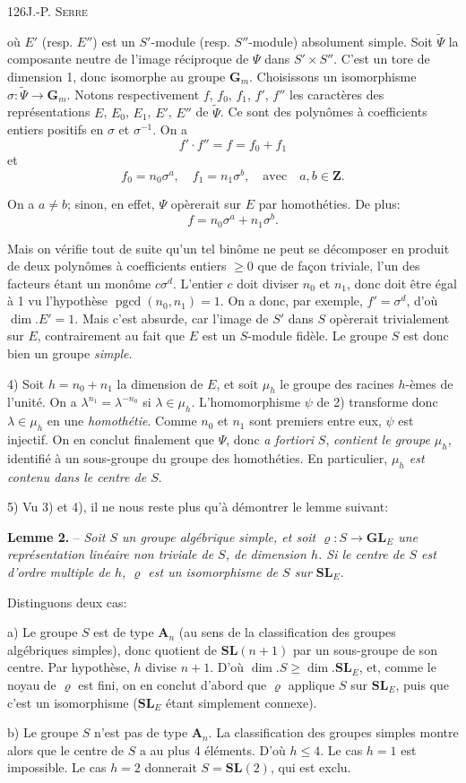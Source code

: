 126\hfill J.-P. \textsc{Serre}

 où $E'$ (resp. $E''$) est un $S'$-module (resp. $S''$-module) absolument simple. Soit $\widetilde\Psi$ la composante neutre de l'image réciproque de $\Psi$ dans $S'\times S''$. C'est un tore de dimension 1, donc isomorphe au groupe $\mathbf G_m$. Choisissons un isomorphisme $\sigma:\widetilde\Psi\to\mathbf G_m$. Notons respectivement $f$, $f_0$, $f_1$, $f'$, $f''$ les caractères des représentations $E$, $E_0$, $E_1$, $E'$, $E''$ de $\widetilde\Psi$. Ce sont des polynômes à coefficients entiers positifs en $\sigma$ et $\sigma^{-1}$. On a
\[
f'\cdot f''=f=f_0+f_1
\]
et
\[
f_0=n_0\sigma^a,\quad f_1=n_1\sigma^b,\quad\text{avec}\quad a,b\in\mathbf Z.
\]

On a $a\ne b$; sinon, en effet, $\Psi$ opèrerait sur $E$ par homothéties. De plus:
\[
f=n_0\sigma^a+n_1\sigma^b.
\]

Mais on vérifie tout de suite qu'un tel binôme ne peut se décomposer en produit de deux polynômes à coefficients entiers $\geq0$ que de façon triviale, l'un des facteurs étant un monôme $c\sigma^d$. L'entier $c$ doit diviser $n_0$ et $n_1$, donc doit être égal à 1 vu l'hypothèse $\operatorname{pgcd}(n_0,n_1)=1$. On a donc, par exemple, $f'=\sigma^d$, d'où $\dim.E'=1$. Mais c'est absurde, car l'image de $S'$ dans $S$ opèrerait trivialement sur $E$, contrairement au fait que $E$ est un $S$-module fidèle. Le groupe $S$ est donc bien un groupe \textit{simple}.

4) Soit $h=n_0+n_1$ la dimension de $E$, et soit $\mu_h$ le groupe des racines $h$-èmes de l'unité. On a $\lambda^{n_1}=\lambda^{-n_0}$ si $\lambda\in\mu_h$. L'homomorphisme $\psi$ de 2) transforme donc $\lambda\in\mu_h$ en une \textit{homothétie}. Comme $n_0$ et $n_1$ sont premiers entre eux, $\psi$ est injectif. On en conclut finalement que $\Psi$, donc \textit{a fortiori} $S$, \textit{contient le groupe $\mu_h$}, identifié à un sous-groupe du groupe des homothéties. En particulier, \textit{$\mu_h$ est contenu dans le centre de $S$}.

5) Vu 3) et 4), il ne nous reste plus qu'à démontrer le lemme suivant:

\textbf{Lemme 2.} -- \textit{Soit $S$ un groupe algébrique simple, et soit $\varrho:S\to\mathbf{GL}_E$ une représentation linéaire non triviale de $S$, de dimension $h$. Si le centre de $S$ est d'ordre multiple de $h$, $\varrho$ est un isomorphisme de $S$ sur $\mathbf{SL}_E$.}

Distinguons deux cas:

 a) Le groupe $S$ est de type $\mathbf A_n$ (au sens de la classification des groupes algébriques simples), donc quotient de $\mathbf{SL}(n+1)$ par un sous-groupe de son centre. Par hypothèse, $h$ divise $n+1$. D'où $\dim.S\geq\dim.\mathbf{SL}_E$, et, comme le noyau de $\varrho$ est fini, on en conclut d'abord que $\varrho$ applique $S$ sur $\mathbf{SL}_E$, puis que c'est un isomorphisme ($\mathbf{SL}_E$ étant simplement connexe).

 b) Le groupe $S$ n'est pas de type $\mathbf A_n$. La classification des groupes simples montre alors que le centre de $S$ a au plus 4 éléments. D'où $h\leq4$. Le cas $h=1$ est impossible. Le cas $h=2$ donnerait $S=\mathbf{SL}(2)$, qui est exclu.
